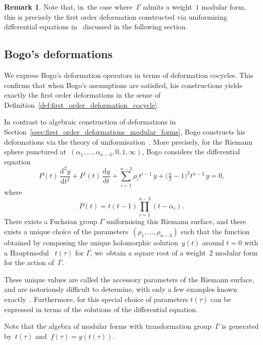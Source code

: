 \documentclass[JEP,XML,SOM,Unicode,published]{cedram}
\theoremstyle{plain}
\theoremstyle{definition}
\newtheorem{remark}[theoremcounter]{Remark}
\newcommand{\tx}{\text}
\newcommand{\rmd}{\ensuremath{\mathrm{d}}}
\let\Ga\Gamma
\newcommand{\dt}{\rmd t}
\begin{document}
\begin{remark}
Note that, in~the case where~$\Ga$ admits a weight~$1$ modular form, this is precisely the first order deformation constructed via uniformising differential equations in~\cite{bogo21} discussed in the following section.
\end{remark}

\subsection{Bogo's deformations}
\label{ssec:bogo-def}

We express Bogo's deformation operators in terms of deformation cocycles. This confirms that when Bogo's assumptions are satisfied, his constructions yields exactly the first order deformations in the sense of Definition~\ref{def:first_order_deformation_cocycle}.

In contrast to algebraic construction of deformations in Section~\ref{ssec:first_order_deformations_modular_forms}, Bogo constructs his deformations via the theory of uniformisation~\cite{bogo21,hempel88}. More precisely, for the Riemann sphere punctured at~$(\alpha_1,\ldots,\alpha_{n-3},0,1,\infty)$, Bogo considers the differential equation
\begin{equation}
\label{eq:bogo_differential_equation}
P(t)\, \frac{\rmd^2 y}{\dt^2}
+ P^\prime(t)\,\frac{\rmd y}{\dt}
+ \sum_{i=1}^{n-3} \rho_i t^{i-1}\,y
+ \bigl(\tfrac{n}{2}-1\bigr)^2 t^{n-3}\,y
= 0
\tx{,}
\end{equation}
where
\begin{equation*}
P(t)=t(t-1)\prod_{i=1}^{n-3}(t-\alpha_i)
\tx{.}
\end{equation*}
There exists a Fuchsian group $\Ga$ uniformising this Riemann surface, and there exists a unique choice of the parameters~$(\rho_1,\ldots,\rho_{n-3})$ such that the function obtained by composing the unique holomorphic solution~$y(t)$ around $t=0$ with a Hauptmodul ~$t(\tau)$ for $\Ga$, we~obtain a square root of a weight~$2$ modular form for the action of~$\Ga$.

These unique values are called the accessory parameters of the Riemann surface, and are notoriously difficult to determine, with only a few examples known exactly~\cite{zagier09}. Furthermore, for this special choice of parameters $t(\tau)$ can be expressed in terms of the solutions of the differential equation.

Note that the algebra of modular forms with transformation group~$\Ga$ is generated by~$t(\tau)$ and~$f(\tau)=y(t(\tau))$.
\end{document}
